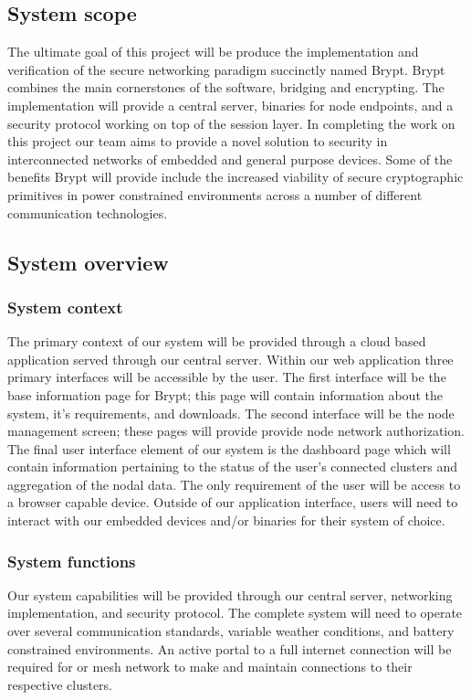 \documentclass[tikz,a4paper,titlepage]{article}
\begin{document}
\subsection{System scope}
The ultimate goal of this project will be produce the implementation and verification of the secure networking paradigm succinctly named Brypt. Brypt combines the main cornerstones of the software, bridging and encrypting. The implementation will provide a central server, binaries for node endpoints, and a security protocol working on top of the session layer. In completing the work on this project our team aims to provide a novel solution to security in interconnected networks of embedded and general purpose devices. Some of the benefits Brypt will provide include the increased viability of secure cryptographic primitives in power constrained environments across a number of different communication technologies. 

\subsection{System overview}
\subsubsection{System context}
The primary context of our system will be provided through a cloud based application served through our central server. Within our web application three primary interfaces will be accessible by the user. The first interface will be the base information page for Brypt; this page will contain information about the system, it’s requirements, and downloads. The second interface will be the node management screen; these pages will provide provide node network authorization. The final user interface element of our system is the dashboard page which will contain information pertaining to the status of the user’s connected clusters and aggregation of the nodal data. The only requirement of the user will be access to a browser capable device. Outside of our application interface, users will need to interact with our embedded devices and/or binaries for their system of choice. 

\subsubsection{System functions}
Our system capabilities will be provided through our central server, networking implementation, and security protocol. The complete system will need to operate over several communication standards, variable weather conditions, and battery constrained environments. An active portal to a full internet connection will be required for or mesh network to make and maintain connections to their respective clusters.
\end{document}
